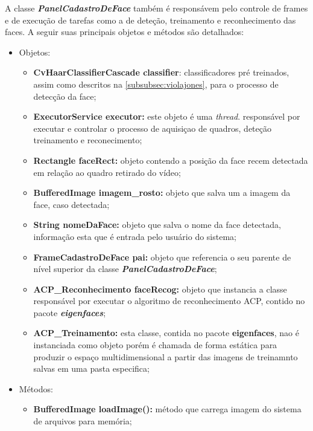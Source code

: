 A classe \textbf{\textit{PanelCadastroDeFace}} também é responsávem pelo controle de frames e de execução de tarefas como a de deteção, treinamento e reconhecimento das faces. A seguir suas principais objetos e métodos são detalhados:

\begin{itemize}
	\item Objetos:
	\begin{itemize}
		\item \textbf{CvHaarClassifierCascade classifier}: classificadores pré treinados, assim como descritos na \autoref{subsubsec:violajones}, para o processo de detecção da face;
		
		\item \textbf{ExecutorService executor:} este objeto é uma \textit{thread}. responsável por executar e controlar o processo de aquisiçao de quadros, deteção treinamento e reconecimento;
		
		\item \textbf{Rectangle faceRect:} objeto contendo a posição da face recem detectada em relação ao quadro retirado do vídeo;
		
		\item \textbf{BufferedImage imagem\_rosto:} objeto que salva um a imagem da face, caso detectada;
		
		\item \textbf{String nomeDaFace:} objeto que salva o nome da face detectada, informação esta que é entrada pelo usuário do sistema;
		
		\item \textbf{FrameCadastroDeFace pai:} objeto que referencia o seu parente de nível superior da classe \textbf{\textit{PanelCadastroDeFace}};
		
		\item \textbf{ACP\_Reconhecimento faceRecog:} objeto que instancia a classe responsável por executar o algoritmo de reconhecimento ACP, contido no pacote \textbf{\textit{eigenfaces}};
		
		\item \textbf{ACP\_Treinamento:} esta classe, contida no pacote \textbf{eigenfaces}, nao é instanciada como objeto porém é chamada de forma estática para produzir o espaço multidimensional a partir das imagens de treinamnto salvas em uma pasta especifica;
		
	\end{itemize}
	
	\item Métodos:
	\begin{itemize}
		\item \textbf{BufferedImage loadImage():} método que carrega imagem do sistema de arquivos para memória;
		

\end{itemize}
\end{itemize}
